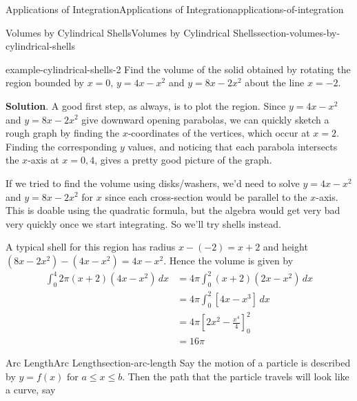 \documentclass[oneside,10pt,]{book}
\numberwithin{equation}{section}
\newcommand{\amp}{&}
\begin{document}
\begin{chapterptx}{Applications of Integration}{}{Applications of Integration}{}{}{applications-of-integration}
\begin{sectionptx}{Volumes by Cylindrical Shells}{}{Volumes by Cylindrical Shells}{}{}{section-volumes-by-cylindrical-shells}
\begin{example}{}{example-cylindrical-shells-2}%
\hypertarget{p-645}{}%
Find the volume of the solid obtained by rotating the region bounded by \(x = 0\), \(y = 4x - x^{2}\) and \(y = 8x - 2x^{2}\) about the line \(x = -2\).%
\par\smallskip%
\noindent\textbf{Solution}.\hypertarget{solution-141}{}\quad%
\hypertarget{p-646}{}%
A good first step, as always, is to plot the region. Since \(y = 4x - x^{2}\) and \(y = 8x - 2x^{2}\) give downward opening parabolas, we can quickly sketch a rough graph by finding the \(x\)-coordinates of the vertices, which occur at \(x = 2\). Finding the corresponding \(y\) values, and noticing that each parabola intersects the \(x\)-axis at \(x = 0, 4\), gives a pretty good picture of the graph.%
\par
\hypertarget{p-647}{}%
If we tried to find the volume using disks\slash{}washers, we'd need to solve \(y = 4x - x^{2}\) and \(y = 8x - 2x^{2}\) for \(x\) since each cross-section would be parallel to the \(x\)-axis. This is doable using the quadratic formula, but the algebra would get very bad very quickly once we start integrating. So we'll try shells instead.%
\par
\hypertarget{p-648}{}%
A typical shell for this region has radius \(x - (-2) = x + 2\) and height \((8x - 2x^{2}) - (4x - x^{2}) = 4x - x^{2}\). Hence the volume is given by%
\begin{align*}
\int_{0}^{4}2\pi(x + 2)(4x - x^{2})\,dx \amp= 4\pi\int_{0}^{2}(x + 2)(2x - x^{2})\,dx\\
\amp= 4\pi\int_{0}^{2}\left[4x - x^{3}\right]\,dx\\
\amp= 4\pi\left[2x^{2} - \frac{x^{4}}{4}\right]_{0}^{2}\\
\amp= 16\pi
\end{align*}
%
\end{example}
\end{sectionptx}
%
%
\typeout{************************************************}
\typeout{************************************************}
%
\begin{sectionptx}{Arc Length}{}{Arc Length}{}{}{section-arc-length}
\hypertarget{p-649}{}%
Say the motion of a particle is described by \(y = f(x) \text{ for } a \leq x \leq b.\) Then the path that the particle travels will look like a curve, say \begin{figure}
\centering
{
}
\end{figure}
\end{sectionptx}
\end{chapterptx}
\end{document}
